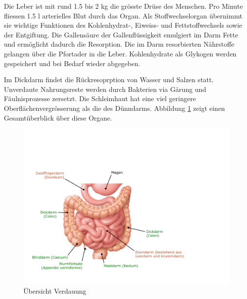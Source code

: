 Die Leber ist mit rund 1.5 bis 2 kg die grösste Drüse des Menschen. Pro Minute fliessen 1.5 l arterielles Blut durch das Organ. Als Stoffwechselorgan übernimmt sie wichtige Funktionen des Kohlenhydrat-, Eiweiss- und Fettstoffwechsels sowie der Entgiftung. Die Gallensäure der Gallenflüssigkeit emulgiert im Darm Fette und ermöglicht dadurch die Resorption. Die im Darm resorbierten Nährstoffe gelangen über die Pfortader in die Leber. Kohlenhydrate als Glykogen werden gespeichert und bei Bedarf wieder abgegeben. 

Im Dickdarm findet die Rückresoprption von Wasser und Salzen statt. Unverdaute Nahrungsreste werden durch Bakterien via Gärung und Fäulnisprozesse zersetzt. Die Schleimhaut hat eine viel geringere Oberflächenvergrösserung als die des Dünndarms. Abbildung \ref{fig:verdauung} zeigt einen Gesamtüberblick über diese Organe.

\begin{figure}
\centering
\includegraphics[width=0.7\linewidth]{fig/verdauung}
\caption{Übersicht Verdauung}
\label{fig:verdauung}
\end{figure}

